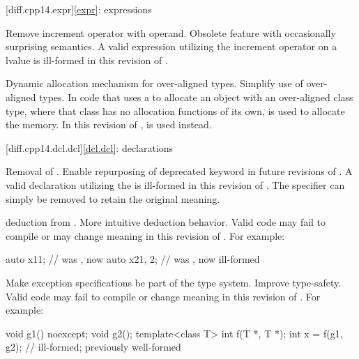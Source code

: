 [diff.cpp14.expr]{\ref{expr}: expressions}

\change
Remove increment operator with  operand.
\rationale
Obsolete feature with occasionally surprising semantics.
\effect
A valid \CppXIV{} expression utilizing the increment operator on
a  lvalue is ill-formed in this revision of \Cpp{}.

\change
Dynamic allocation mechanism for over-aligned types.
\rationale
Simplify use of over-aligned types.
\effect
In \CppXIV{} code that uses a 
to allocate an object with an over-aligned class type,
where that class has no allocation functions of its own,
is used to allocate the memory.
In this revision of \Cpp{},
is used instead.

[diff.cpp14.dcl.dcl]{\ref{dcl.dcl}: declarations}

%
\change
Removal of  .
\rationale
Enable repurposing of deprecated keyword in future revisions of \Cpp{}.
\effect
A valid \CppXIV{} declaration utilizing the 
 is ill-formed in this revision of \Cpp{}.
The specifier can simply be removed to retain the original meaning.

\change
{} deduction from .
\rationale
More intuitive deduction behavior.
\effect
Valid \CppXIV{} code may fail to compile or may change meaning
in this revision of \Cpp{}.
For example:
\begin{codeblock}
auto x1{1};         // was , now 
auto x2{1, 2};      // was , now ill-formed
\end{codeblock}

\change
Make exception specifications be part of the type system.
\rationale
Improve type-safety.
\effect
Valid \CppXIV{} code may fail to compile or change meaning in this
revision of \Cpp{}.
For example:
\begin{codeblock}
void g1() noexcept;
void g2();
template<class T> int f(T *, T *);
int x = f(g1, g2);              // ill-formed; previously well-formed
\end{codeblock}

